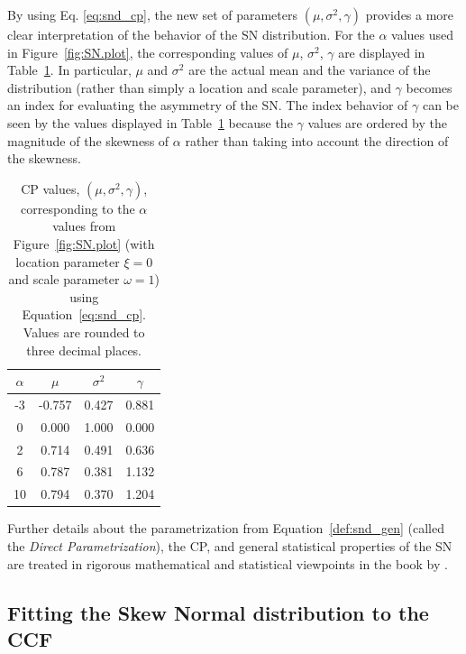 \documentclass[11pt, oneside]{article}
\begin{document}
By using Eq. \ref{eq:snd_cp}, the new set of parameters $(\mu, \sigma^2, \gamma)$ provides a more clear interpretation of the behavior of the SN distribution. For the $\alpha$ values used in Figure~\ref{fig:SN.plot}, the corresponding values of $\mu$, $\sigma^2$, $\gamma$ are displayed in Table~\ref{tab:cp_values}.  In particular, $\mu$ and $\sigma^2$ are the actual mean and the variance of the distribution (rather than simply a location and scale parameter), and $\gamma$ becomes an index for evaluating the asymmetry of the SN.  The index behavior of $\gamma$ can be seen by the values displayed in Table~\ref{tab:cp_values} because the $\gamma$ values are ordered by the magnitude of the skewness of $\alpha$ rather than taking into account the direction of the skewness.
\begin{table}[htbp]
   \centering
   \begin{tabular}{|cccc|} %
\hline
$\alpha$ & $\mu$ & $\sigma^2$ & $\gamma$ \\
\hline
 -3 	&	 -0.757	&	 0.427	&	 0.881 \\
0	&	 0.000 	&	1.000	&	 0.000 \\
2	&	 0.714	&	 0.491	&	 0.636 \\
6	&	 0.787	&	 0.381	&	 1.132\\
10	&	 0.794	&	 0.370	&	 1.204\\
\hline
   \end{tabular}
   \caption{CP values, $(\mu, \sigma^2, \gamma)$, corresponding to the $\alpha$ values from Figure~\ref{fig:SN.plot} (with location parameter $\xi = 0$ and scale parameter $\omega = 1$) using Equation~\eqref{eq:snd_cp}.  Values are rounded to three decimal places.}
   \label{tab:cp_values}
\end{table}
%
Further details about the parametrization from Equation~\eqref{def:snd_gen} (called the \emph{Direct Parametrization}), the CP, and general statistical properties of the SN are treated in rigorous mathematical and statistical viewpoints in the book by \cite{Azzalini2014}.

\subsection{Fitting the Skew Normal distribution to the CCF} \label{sec:3}
\end{document}
